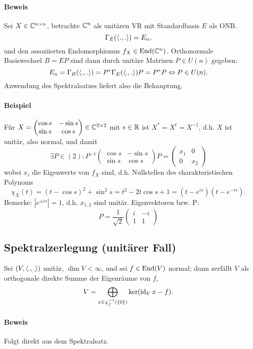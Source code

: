 \paragraph{Beweis}
	Sei $ X\in \mathbb{C}^{n\times n} $, betrachte $ \mathbb{C}^n $ als unitären VR mit Standardbasis $ E $ als ONB.
		\[ \Gamma_E(\langle .,. \rangle) = E_n, \]
	und den assoziierten Endomorphismus $ f_X\in \operatorname{End}(\mathbb{C}^n) $. Orthonormale Basiswechsel $ B=EP $ sind dann durch unitäre Matrizen $ P\in U(n) $ gegeben:
		\[ E_n = \Gamma_B(\langle .,. \rangle) = P^*\Gamma_E(\langle .,. \rangle)P = P^*P \Leftrightarrow P\in U(n). \]
	Anwendung des Spektralsatzes liefert also die Behauptung.

\paragraph{Beispiel}
	Für  $ X = \begin{pmatrix}
	\cos s & -\sin s\\ \sin s & \cos s
	\end{pmatrix}\in \mathbb{C}^{2\times 2} $ mit $ s\in \mathbb{R} $ ist $ X^*=X^t = X^{-1} $, d.h. $ X $ ist unitär, also normal, und damit
		\[ \exists P\in (2): P^{-1}\begin{pmatrix}
		\cos s & -\sin s\\ \sin s & \cos s
		\end{pmatrix}P = \begin{pmatrix}
		x_1 & 0 \\ 0 & x_2
		\end{pmatrix} \]
	wobei $ x_i $ die Eigenwerte von $ f_X $ sind, d.h. Nullstellen des charakteristischen Polynoms
		\[ \chi_X(t) = (t-\cos s)^2 + \sin^2 s = t^2-2t\cos s + 1 = (t-e^{is})(t-e^{-is}). \]
	Bemerke: $ |e^{\pm is}| = 1 $, d.h. $ x_{1,2} $ sind unitär. Eigenvektoren bzw. P:
		\[ P = \frac{1}{\sqrt{2}}\begin{pmatrix} i & -i \\ 1 & 1 \end{pmatrix} \]

\subsection{Spektralzerlegung (unitärer Fall)}
\begin{Lemma}[]
	Sei $ (V,\langle .,. \rangle) $ unitär, $ \dim V <\infty $, und sei $ f\in \operatorname{End}(V) $ normal; dann zerfällt $ V $ als orthogonale direkte Summe der Eigenräume von $ f $,
		\[ V = \bigoplus_{x\in \chi_f^{-1}(\{0\})} \ker(\operatorname{id}_Vx-f). \]
\end{Lemma}
\paragraph{Beweis}
	Folgt direkt aus dem Spektralsatz.
